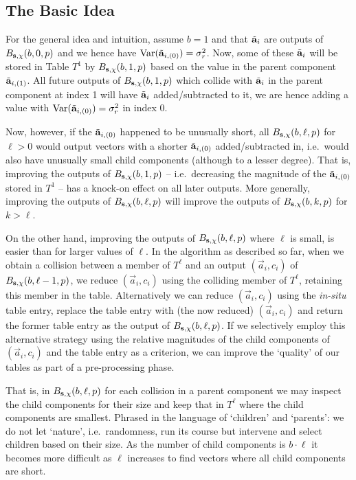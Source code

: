 \subsection{The Basic Idea}
For the general idea and intuition, assume $b=1$ and that $\tilde{\mathbf{a}}_{i}$ are outputs of $B_{\mathbf{s},\chi}(b,0,p)$ and we hence have $\textnormal{Var}(\tilde{\mathbf{a}}_{i,(0)}) = \sigma_r^2$. Now, some of these $\tilde{\mathbf{a}}_i$ will be stored in Table $T^1$ by $B_{\mathbf{s},\chi}(b,1,p)$ based on the value in the parent component $\tilde{\mathbf{a}}_{i,(1)}$. All future outputs of $B_{\mathbf{s},\chi}(b,1,p)$ which collide with $\tilde{\mathbf{a}}_{i}$ in the parent component at index 1 will have  $\tilde{\mathbf{a}}_i$ added/subtracted to it, we are hence adding a value with $\textnormal{Var}(\tilde{\mathbf{a}}_{i,(0)}) = \sigma_r^2$ in index 0.

Now, however, if the $\tilde{\mathbf{a}}_{i,(0)}$ happened to be unusually short, all $B_{\mathbf{s},\chi}(b,\ell,p)$ for $\ell > 0$ would output vectors with a shorter $\tilde{\mathbf{a}}_{i,(0)}$ added/subtracted in, i.e.\ would also have unusually small child components (although to a lesser degree). That is, improving the outputs of $B_{\mathbf{s},\chi}(b,1,p)$ -- i.e.\ decreasing the magnitude of the $\tilde{\mathbf{a}}_{i,(0)}$ stored in $T^1$ -- has a knock-on effect on all later outputs. More generally, improving the outputs of $B_{\mathbf{s},\chi}(b,\ell,p)$ will improve the outputs of $B_{\mathbf{s},\chi}(b,k,p)$ for $k>\ell$.

On the other hand, improving the outputs of $B_{\mathbf{s},\chi}(b,\ell,p)$ where $\ell$ is small, is easier than for larger values of $\ell$. In the algorithm as described so far, when we obtain a collision between a member of $T^\ell$ and an output $(\vec{a}_i, c_i)$ of $B_{\mathbf{s},\chi}(b,\ell-1,p)$, we reduce $(\vec{a}_i, c_i)$ using the colliding member of $T^\ell$, retaining this member in the table. Alternatively we can reduce $(\vec{a}_i, c_i)$ using the \emph{in-situ} table entry, replace the table entry with (the now reduced) $(\vec{a}_i, c_i)$ and return the former table entry as the output of $B_{\mathbf{s},\chi}(b,\ell,p)$. If we selectively employ this alternative strategy using the relative magnitudes of the child components of $(\vec{a}_i, c_i)$  and the table entry as a criterion, we can improve the `quality' of our tables as part of a pre-processing phase.

That is, in $B_{\mathbf{s},\chi}(b,\ell,p)$ for each collision in a parent component we may inspect the child components for their size and keep that in $T^\ell$ where the child components are smallest. Phrased in the language of `children' and `parents': we do not let `nature', i.e.\ randomness, run its course but intervene and select children based on their size. As the number of child components is $b \cdot \ell$ it becomes more difficult as $\ell$ increases to find vectors where all child components are short.

